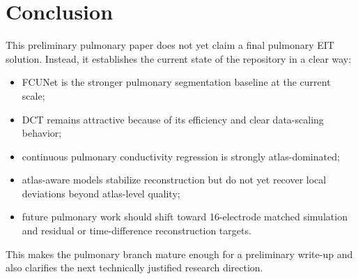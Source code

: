 \documentclass[11pt,a4paper]{article}
\begin{document}
\section{Conclusion}
This preliminary pulmonary paper does not yet claim a final pulmonary EIT solution. Instead, it establishes the current state of the repository in a clear way:
\begin{itemize}[leftmargin=1.5em]
    \item FCUNet is the stronger pulmonary segmentation baseline at the current scale;
    \item DCT remains attractive because of its efficiency and clear data-scaling behavior;
    \item continuous pulmonary conductivity regression is strongly atlas-dominated;
    \item atlas-aware models stabilize reconstruction but do not yet recover local deviations beyond atlas-level quality;
    \item future pulmonary work should shift toward 16-electrode matched simulation and residual or time-difference reconstruction targets.
\end{itemize}

This makes the pulmonary branch mature enough for a preliminary write-up and also clarifies the next technically justified research direction.



\end{document}
